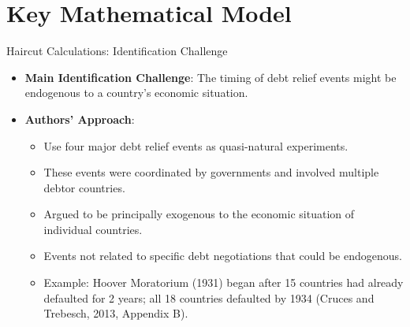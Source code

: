 \documentclass{beamer}
\begin{document}
\section{Key Mathematical Model}

\begin{frame}{Haircut Calculations: Identification Challenge}
  \label{sec:haircutcalc}
  \begin{itemize}
    \item \textbf{Main Identification Challenge}: The timing of debt relief events might be endogenous to a country's economic situation.
    \item \textbf{Authors' Approach}:
    \begin{itemize}
        \item Use four major debt relief events as quasi-natural experiments.
        \item These events were coordinated by governments and involved multiple debtor countries.
        \item Argued to be principally exogenous to the economic situation of individual countries.
        \item Events not related to specific debt negotiations that could be endogenous.
        \item Example: Hoover Moratorium (1931) began after 15 countries had already defaulted for 2 years; all 18 countries defaulted by 1934 (Cruces and Trebesch, 2013, Appendix B).
    \end{itemize}
  \end{itemize}
\end{frame}
\end{document}
